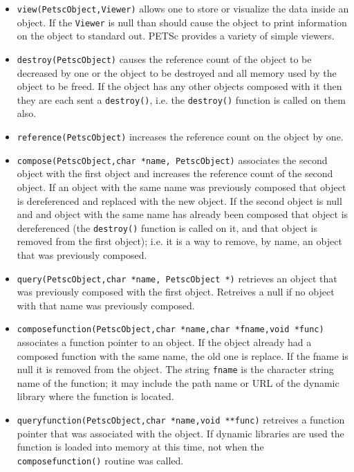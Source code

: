 \begin{itemize}
\item {\tt view(PetscObject,Viewer)} allows one to store or visualize the data inside
      an object. If the {\tt Viewer} is null than should cause the object to print 
      information on the object to standard out. PETSc provides a variety of simple
      viewers.

\item {\tt destroy(PetscObject)} causes the reference count of the object to be decreased
      by one or the object to be destroyed and all memory used by the object to be freed.
      If the object has any other objects composed with it then they are each sent a
      {\tt destroy()}, i.e. the {\tt destroy()} function is called on them also.

\item {\tt reference(PetscObject)} increases the reference count on the object by one.

\item {\tt compose(PetscObject,char *name, PetscObject)} associates the second object with 
      the first object and increases the reference count of the second object. If an
      object with the 
      same name was previously composed that object is dereferenced and replaced with 
      the new object. If the 
      second object is null and and object with the same name has already been 
      composed that object is dereferenced (the {\tt destroy()} function is called on 
      it, and that object is removed from the first object); i.e. it is a way to 
      remove, by name, an object that was previously composed. 

\item {\tt query(PetscObject,char *name, PetscObject *)} retrieves an object that was 
      previously composed with the first object. Retreives a null if no object with 
      that name was previously composed.

\item {\tt composefunction(PetscObject,char *name,char *fname,void *func)} associates a function
      pointer to an object. If the object already had a composed function with the 
      same name, the old one is replace. If the fname is null it is removed from 
      the object. The string {\tt fname} is the  character string name of the function;
      it may include the path name or URL of the dynamic library where the function is located.

\item {\tt queryfunction(PetscObject,char *name,void **func)} retreives a function pointer that
      was associated with the object. If dynamic libraries are used the function is loaded
      into memory at this time, not when the {\tt composefunction()} routine was called.

\end{itemize}

